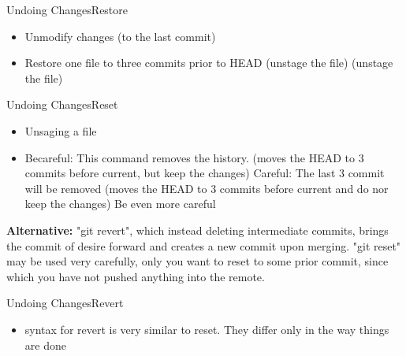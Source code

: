 \begin{frame}{Undoing Changes}{Restore}
\begin{itemize}
  \item Unmodify changes (to the last commit)
  \item Restore one file to three commits prior to HEAD
     (unstage the file)
     (unstage the file)
\end{itemize}
\end{frame}

\begin{frame}{Undoing Changes}{Reset}
\begin{itemize}
 \item Unsaging a file
 \item Becareful: This command removes the history.
    (moves the HEAD to 3 commits before current, but keep the changes)
   {\color{red} Careful: The last 3 commit will be removed}
    (moves the HEAD to 3 commits before current and do nor keep the changes)
     {\color{red} Be even more careful}
\end{itemize}
{\textbf{ \color{green} Alternative:}} {\footnotesize "git revert", which instead deleting intermediate 
commits, brings the commit of desire forward and creates a new commit upon merging.
"git reset" may be used very carefully, only you want to reset to some prior commit, 
since which you have not pushed anything into the remote.}
\end{frame}

\begin{frame}{Undoing Changes}{Revert}
\begin{itemize}
  \item syntax for revert is very similar to reset. They differ only in the way things are done
\end{itemize}
\end{frame}
